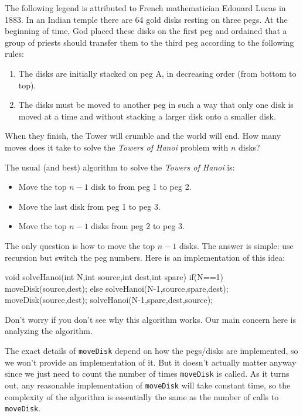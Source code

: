 \begin{exa}
The following legend is attributed to
 French mathematician Edouard Lucas in 1883. 
In an Indian temple there are 64 gold disks resting on three pegs. 
At the beginning of time, God placed these disks on the first peg
and ordained that a group of priests should transfer them to the third peg according to the following rules:
\begin{enumerate}
\item The disks are initially stacked on peg A, in decreasing order (from bottom to top).
\item The disks must be moved to another peg in such a way that only one disk 
is moved at a time and without stacking a larger disk onto a smaller disk.
\end{enumerate}
When they finish, the Tower will crumble and the world will end. 
How many moves does it take to solve the {\em Towers of Hanoi} problem with $n$ disks?
\begin{sol}
The usual (and best) algorithm to solve the 
{\em Towers of Hanoi} is:
\begin{itemize}
\item
Move the top $n-1$ disk to from peg 1 to peg 2.
\item
Move the last disk from peg 1 to peg 3.
\item
Move the top $n-1$ disks from peg 2 to peg 3.
\end{itemize}
The only question is how to move the top $n-1$ disks.
The answer is simple: use recursion but switch the peg numbers.
Here is an implementation of this idea:
\begin{code}
  void solveHanoi(int N,int source,int dest,int spare) {
      if(N==1) {
          moveDisk(source,dest);
      } else {
          solveHanoi(N-1,source,spare,dest);
          moveDisk(source,dest);
          solveHanoi(N-1,spare,dest,source);
      }
  }
\end{code}
Don't worry if you don't see why this algorithm works.
Our main concern here is analyzing the algorithm.

The exact details of \verb+moveDisk+ depend on how the pegs/disks
are implemented, so we won't provide an implementation of it.
But it doesn't actually matter anyway since we just need to count 
the number of times \verb+moveDisk+ is called.  As it turns out,
any reasonable implementation of \verb+moveDisk+ will take
constant time, so the complexity of the algorithm is essentially
the same as the number of calls to \verb+moveDisk+.


\end{sol}
\end{exa}
